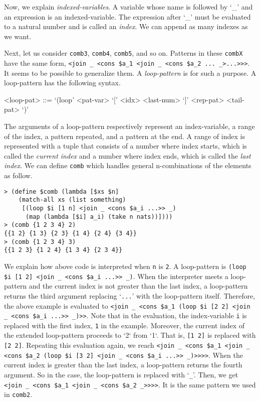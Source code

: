 \documentclass{article}
\begin{document}
Now, we explain \textit{indexed-variables}.
A variable whose name is followed by `_' and an expression is an indexed-variable.
The expression after `_' must be evaluated to a natural number and is called an \textit{index}.
We can append as many indexes as we want.

Next, let us consider  \texttt{comb3}, \texttt{comb4}, \texttt{comb5}, and so on.
Patterns in these \texttt{combX} have the same form, \texttt{<join \_ <cons \$a\_1 <join \_ <cons \$a\_2 ... \_>...>>>}.
It seems to be possible to generalize them.
A \textit{loop-pattern} is for such a purpose.
A loop-pattern has the following syntax.

\begin{grammar}
<loop-pat> ::= `(loop' <pat-var> `[' <idx> <last-num> `]' <rep-pat> <tail-pat> `)'
\end{grammar}

The arguments of a loop-pattern respectively represent an index-variable, a range of the index, a pattern repeated, and a pattern at the end.
A range of index is represented with a tuple that consists of a number where index starts, which is called the \textit{current index} and a number where index ends, which is called the \textit{last index}.
We can define \texttt{comb} which handles general n-combinations of the elements as follow.

{\footnotesize
\begin{verbatim}
> (define $comb (lambda [$xs $n]
    (match-all xs (list something)
     [(loop $i [1 n] <join _ <cons $a_i ...>> _)
      (map (lambda [$i] a_i) (take n nats))])))
> (comb {1 2 3 4} 2)
{{1 2} {1 3} {2 3} {1 4} {2 4} {3 4}}
> (comb {1 2 3 4} 3)
{{1 2 3} {1 2 4} {1 3 4} {2 3 4}}
\end{verbatim}
}

We explain how above code is interpreted when \texttt{n} is \texttt{2}.
A loop-pattern is \texttt{(loop \$i [1 2] <join \_ <cons \$a\_i ...>> \_)}.
When the interpreter meets a loop-pattern and the current index is not greater than the last index, a loop-pattern returns the third argument replacing `\texttt{...}' with the loop-pattern itself.
Therefore, the above example is evaluated to \texttt{<join \_ <cons \$a\_1 (loop \$i [2 2] <join \_ <cons \$a\_i ...>> \_)>>}.
Note that in the evaluation, the index-variable \texttt{i} is replaced with the first index, \texttt{1} in the example.
Moreover, the current index of the extended loop-pattern proceeds to `2` from `1`.
That is, \texttt{[1 2]} is replaced with \texttt{[2 2]}.
Repeating this evaluation again, we reach
\texttt{<join \_ <cons \$a\_1 <join \_ <cons \$a\_2 (loop \$i [3 2] <join \_ <cons \$a\_i ...>> \_)>>>>}.
When the current index is greater than the last index, a loop-pattern returns the fourth argument.
So in the case, the loop-pattern is replaced with `\texttt{\_}'.
Then, we get \texttt{<join \_ <cons \$a\_1 <join \_ <cons \$a\_2 \_>>>>}.
It is the same pattern we used in \texttt{comb2}.
\end{document}

